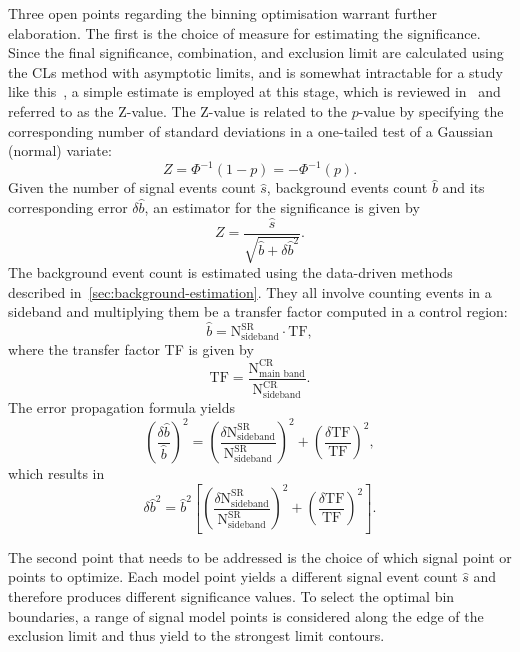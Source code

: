 Three open points regarding the binning optimisation warrant further elaboration. The first is the choice of measure for estimating the significance. Since the final significance, combination, and exclusion limit are calculated using the CLs method with asymptotic limits, and is somewhat intractable for a study like this~\cite{higgs-combine-site}, a simple estimate is employed at this stage, which is reviewed in~\cite{pvalue,Cousins:2007bmb} and referred to as the Z-value. The Z-value is related to the $p$-value by specifying the corresponding number of standard deviations in a one-tailed test of a Gaussian (normal) variate:
\begin{equation}
Z = \Phi^{-1}(1-p)=-\Phi^{-1}(p).
\end{equation}
Given the number of signal events count $\hat{s}$, background events count $\hat{b}$ and its corresponding error $\delta \hat{b}$, an estimator for the significance is given by
\begin{equation}
Z = \frac{\hat{s}}{\sqrt{\hat{b}+\delta \hat{b}^2}}.
\end{equation}
The background event count is estimated using the data-driven methods described in~\ref{sec:background-estimation}. They all involve counting events in a sideband and multiplying them be a transfer factor computed in a control region:
\begin{equation}
\hat{b} = \mathrm{N}^{\mathrm{SR}}_{\text{sideband}}\cdot \mathrm{TF},
\end{equation}
where the transfer factor TF is given by 
\begin{equation}
\mathrm{TF}=\frac{\mathrm{N}^{\mathrm{CR}}_{\text{main band}}}{\mathrm{N}^{\mathrm{CR}}_{\text{sideband}}}.
\end{equation}
The error propagation formula yields
\begin{equation}
\left( \frac{\delta \hat{b}}{\hat{b}}  \right)^2=\left( \frac{\delta \mathrm{N}^{\mathrm{SR}}_{\text{sideband}}}{\mathrm{N}^{\mathrm{SR}}_{\text{sideband}}}  \right)^2 + \left( \frac{\delta \mathrm{TF}}{\mathrm{TF}}  \right)^2,
\end{equation}
which results in
\begin{equation}
\delta \hat{b}^2=\hat{b}^2 \left[ \left( \frac{\delta \mathrm{N}^{\mathrm{SR}}_{\text{sideband}}}{\mathrm{N}^{\mathrm{SR}}_{\text{sideband}}}  \right)^2 + \left( \frac{\delta \mathrm{TF}}{\mathrm{TF}}  \right)^2 \right] .
\end{equation}

The second point that needs to be addressed is the choice of which signal point or points to optimize. Each model point yields a different signal event count $\hat{s}$ and therefore produces different significance values. To select the optimal bin boundaries, a range of signal model points is considered along the edge of the exclusion limit and thus yield to the strongest limit contours.

